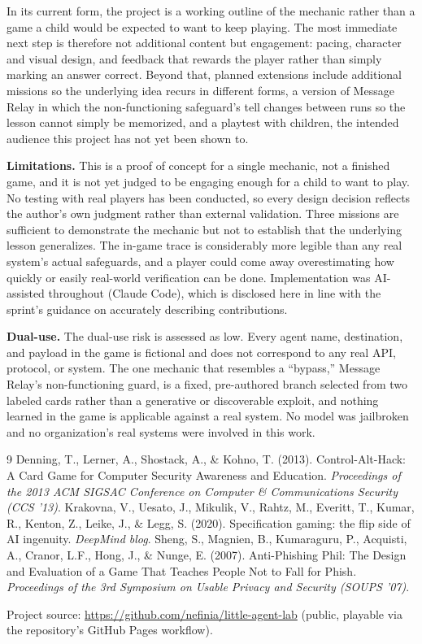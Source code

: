 \documentclass[11pt]{article}
\begin{document}
In its current form, the project is a working outline of the mechanic rather than a game a child would be expected to want to keep playing. The most immediate next step is therefore not additional content but engagement: pacing, character and visual design, and feedback that rewards the player rather than simply marking an answer correct. Beyond that, planned extensions include additional missions so the underlying idea recurs in different forms, a version of Message Relay in which the non-functioning safeguard's tell changes between runs so the lesson cannot simply be memorized, and a playtest with children, the intended audience this project has not yet been shown to.

\begin{tcolorbox}[colback=orange!5,colframe=orange!50!black,title=\textbf{Limitations and Dual-Use Considerations}]
\textbf{Limitations.} This is a proof of concept for a single mechanic, not a finished game, and it is not yet judged to be engaging enough for a child to want to play. No testing with real players has been conducted, so every design decision reflects the author's own judgment rather than external validation. Three missions are sufficient to demonstrate the mechanic but not to establish that the underlying lesson generalizes. The in-game trace is considerably more legible than any real system's actual safeguards, and a player could come away overestimating how quickly or easily real-world verification can be done. Implementation was AI-assisted throughout (Claude Code), which is disclosed here in line with the sprint's guidance on accurately describing contributions.

\textbf{Dual-use.} The dual-use risk is assessed as low. Every agent name, destination, and payload in the game is fictional and does not correspond to any real API, protocol, or system. The one mechanic that resembles a ``bypass,'' Message Relay's non-functioning guard, is a fixed, pre-authored branch selected from two labeled cards rather than a generative or discoverable exploit, and nothing learned in the game is applicable against a real system. No model was jailbroken and no organization's real systems were involved in this work.
\end{tcolorbox}

\begin{thebibliography}{9}
 Denning, T., Lerner, A., Shostack, A., \& Kohno, T. (2013). Control-Alt-Hack: A Card Game for Computer Security Awareness and Education. \textit{Proceedings of the 2013 ACM SIGSAC Conference on Computer \& Communications Security (CCS '13)}.
 Krakovna, V., Uesato, J., Mikulik, V., Rahtz, M., Everitt, T., Kumar, R., Kenton, Z., Leike, J., \& Legg, S. (2020). Specification gaming: the flip side of AI ingenuity. \textit{DeepMind blog}.
 Sheng, S., Magnien, B., Kumaraguru, P., Acquisti, A., Cranor, L.F., Hong, J., \& Nunge, E. (2007). Anti-Phishing Phil: The Design and Evaluation of a Game That Teaches People Not to Fall for Phish. \textit{Proceedings of the 3rd Symposium on Usable Privacy and Security (SOUPS '07)}.
\end{thebibliography}

\vspace{0.5em}
\footnotesize
Project source: \url{https://github.com/nefinia/little-agent-lab} (public, playable via the repository's GitHub Pages workflow).
\end{document}
